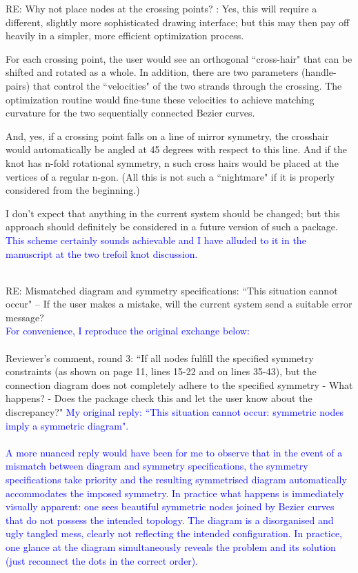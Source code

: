 \documentclass[12pt]{article}
\begin{document}
RE: Why not place nodes at the crossing points? : Yes, this will
require a different, slightly more sophisticated drawing interface;
but this may then pay off heavily in a simpler, more efficient
optimization process.

For each crossing point, the user would see an orthogonal ``cross-hair"
that can be shifted and rotated as a whole.  In addition, there are
two parameters (handle-pairs) that control the ``velocities" of the two
strands through the crossing.  The optimization routine would
fine-tune these velocities to achieve matching curvature for the two
sequentially connected Bezier curves.

And, yes, if a crossing point falls on a line of mirror symmetry, the
crosshair would automatically be angled at 45 degrees with respect to
this line.  And if the knot has n-fold rotational symmetry, n such
cross hairs would be placed at the vertices of a regular n-gon.  (All
this is not such a ``nightmare" if it is properly considered from the
beginning.)

I don't expect that anything in the current system should be changed;
but this approach should definitely be considered in a future version
of such a package.
\textcolor{blue}{\\ This scheme certainly sounds achievable and I have
  alluded to it in the manuscript at the two trefoil knot
  discussion.\\ \\}


RE: Mismatched diagram and symmetry specifications: ``This situation
cannot occur" -- If the user makes a mistake, will the current system
send a suitable error message?\textcolor{blue}{\\For convenience, I
  reproduce the original exchange below:\\ \\} {\tiny Reviewer's
  comment, round 3: ``If all nodes fulfill the specified symmetry
  constraints (as shown on page 11, lines 15-22 and on lines 35-43),
  but the connection diagram does not completely adhere to the
  specified symmetry - What happens? - Does the package check this and
  let the user know about the discrepancy?"}  \textcolor{blue}{\tiny
  My original reply: ``This situation cannot occur: symmetric nodes
  imply a symmetric diagram".\\ \\} \textcolor{blue}{A more nuanced
  reply would have been for me to observe that in the event of a
  mismatch between diagram and symmetry specifications, the symmetry
  specifications take priority and the resulting symmetrised diagram
  automatically accommodates the imposed symmetry.  In practice what
  happens is immediately visually apparent: one sees beautiful
  symmetric nodes joined by Bezier curves that do not possess the
  intended topology.  The diagram is a disorganised and ugly tangled
  mess, clearly not reflecting the intended configuration.  In
  practice, one glance at the diagram simultaneously reveals the
  problem and its solution (just reconnect the dots in the correct
  order).\\ \\}
\end{document}
